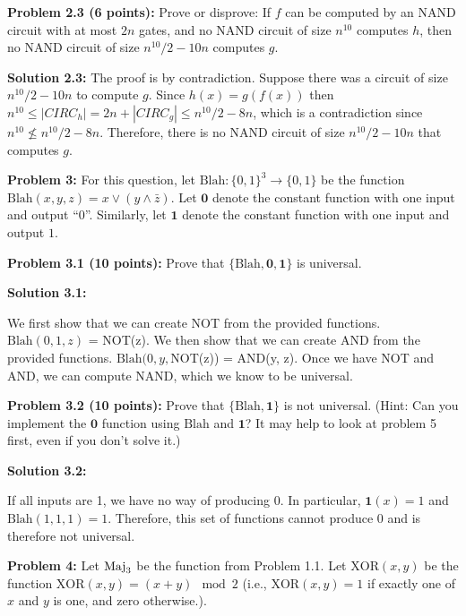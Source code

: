 \documentclass[11pt]{article}
\begin{document}
\textbf{Problem 2.3 (6 points):} Prove or disprove: If $f$ can be computed by an  NAND circuit with at most $2n$ gates, and no NAND circuit of size $n^{10}$ computes $h$, then no NAND circuit of size $n^{10}/2-10n$ computes $g$. 

\textbf{Solution 2.3:} %
The proof is by contradiction. Suppose there was a circuit of size $n^{10}/2-10n$ to compute $g$. Since $h(x) = g(f(x))$ then $n^{10} \leq |CIRC_h| = 2n + |CIRC_g| \leq n^{10}/2-8n$, which is a contradiction since
$n^{10} \nleq n^{10}/2-8n$. Therefore, there is no NAND circuit of size $n^{10}/2-10n$ that computes $g$.

\newpage

\newcommand{\Blah}{\mathrm{Blah}}
\newcommand{\Zero}{\mathbf{0}}
\newcommand{\One}{\mathbf{1}}

\newcommand{\XOR}{\mathrm{XOR}}

\iffalse{
Not sure what this text was doing here ... commented it out - (- Madhu)	
	f(0)=0
f(1)=1
f(a+b)+f(0)=f(a)+f(b)} \fi  


\textbf{Problem 3:} For this question, let $\Blah:\{0,1\}^3 \to\{0,1\}$ be the function $\Blah(x,y,z) = x \vee (y \wedge \bar{z})$. Let $\Zero$ denote the constant function with one input and output ``$0$''. Similarly, let $\One$ denote the constant function with one input and output $1$. 

\textbf{Problem 3.1 (10 points):} Prove that $\{\Blah,\Zero,\One\}$ is universal. 

\textbf{Solution 3.1:} %

We first show that we can create NOT from the provided functions. $\Blah(0,1,z)$ = NOT(z). We then show that we can create AND from the provided functions.
$\Blah(0,y,$NOT(z)) = AND(y, z). Once we have NOT and AND, we can compute NAND, which we know to be universal.

\textbf{Problem 3.2 (10 points):} Prove that $\{\Blah,\One\}$ is not universal. (Hint: Can you implement the $\Zero$ function using $\Blah$ and $\One$? It may help to look at problem 5 first, even if you don't solve it.)

\textbf{Solution 3.2:} %

If all inputs are 1, we have no way of producing 0. In particular, $\One(x) = 1$ and $\Blah(1, 1, 1) = 1$. Therefore, this set of functions cannot produce 0 and is therefore not universal.

\newpage

\textbf{Problem 4:} Let $\mathrm{Maj}_3$ be the function from Problem 1.1. Let $\XOR(x,y)$ be the function $\XOR(x,y) = (x + y) \mod 2$ (i.e., $\XOR(x,y) = 1$ if exactly one of $x$ and $y$ is one, and zero otherwise.).
\end{document}
